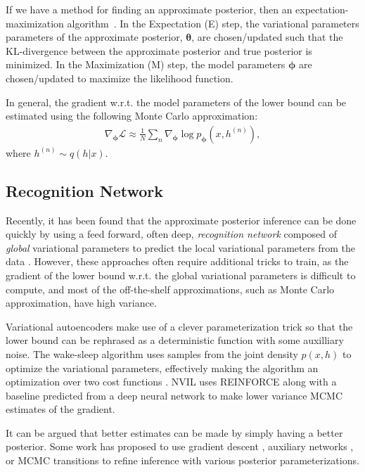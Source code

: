 \documentclass{article} %
\newcommand{\vects}[1]{\boldsymbol{#1}}
\newcommand{\TT}[0]{\vects{\theta}}
\newcommand{\PP}[0]{\vects{\phi}}
\newcommand{\LL}[0]{\mathcal{L}}
\begin{document}
If we have a method for finding an approximate posterior, then an
expectation-maximization
algorithm~\citep[EM,][]{dempster1977maximum, neal1998view}.  In the Expectation (E)
step, the variational parameters parameters of the approximate posterior, $\TT$,
are chosen/updated such that the KL-divergence between the approximate posterior and
true posterior is minimized. In the Maximization (M) step, the model parameters
$\PP$ are chosen/updated to maximize the likelihood function.

In general, the gradient w.r.t. the model parameters of the lower bound can be
estimated using the following Monte Carlo approximation:
\begin{align}
\nabla_{\PP} \LL \approx \frac{1}{N} \sum_n \nabla_{\PP} \log p_{\PP}(x, h^{(n)}),
\end{align}
where $h^{(n)} \sim q(h|x)$.

\subsection{Recognition Network}

Recently, it has been found that the approximate posterior inference can be done
quickly by using a feed forward, often deep, \emph{recognition network} composed
of \emph{global} variational parameters to predict the local variational
parameters from the data \citep[see,
e.g.,][]{kingma2013auto,mnih2014neural,rezende2014stochastic}. However, these
approaches often require additional tricks to train, as the gradient of the
lower bound w.r.t. the global variational parameters is difficult to compute,
and most of the off-the-shelf approximations, such as Monte Carlo approximation,
have high variance. 

Variational autoencoders \citep[VAE,][]{kingma2013auto} make use of a clever
parameterization trick so that the lower bound can be rephrased as a
deterministic function with some auxilliary noise. The wake-sleep algorithm uses
samples from the joint density $p(x, h)$ to optimize the variational parameters,
effectively making the algorithm an optimization over two cost functions
\citep{hinton1995wake}. NVIL
uses REINFORCE along with a baseline predicted from a deep neural network to
make lower variance MCMC estimates of the gradient.

It can be argued that better estimates can be made by simply having a better
posterior. Some work has proposed to use gradient descent
\citep{hoffman2013stochastic}, auxiliary networks
\citep{rezende2015variational}, or MCMC transitions \citep{salimans2014markov}
to refine inference with various posterior parameterizations. 
\end{document}
